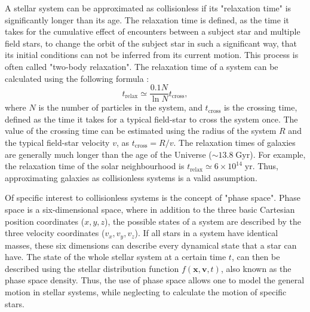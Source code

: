 \documentclass[english, twoside]{HYgradu}
\begin{document}
A stellar system can be approximated as collisionless if its "relaxation time" is significantly longer than its age. The relaxation time is defined, as the time it takes for the cumulative effect of encounters between a subject star and multiple field stars, to change the orbit of the subject star in such a significant way, that its initial conditions can not be inferred from its current motion. This process is often called "two-body relaxation". The relaxation time of a system can be calculated using the following formula \citep{BinneyTremaine}:
\begin{equation}
t_\mathrm{relax} \simeq \frac{0.1N}{\ln N} t_\mathrm{cross},
\end{equation}
where $N$ is the number of particles in the system, and $t_\mathrm{cross}$ is the crossing time, defined as the time it takes for a typical field-star to cross the system once.  The value of the crossing time can be estimated using the radius of the system $R$ and the typical field-star velocity $v$, as $t_\mathrm{cross} = R/v$. The relaxation times of galaxies are generally much longer than the age of the Universe ($\sim 13.8 \; \mathrm{Gyr}$). For example, the relaxation time of the solar neighbourhood is $t_\mathrm{relax} \simeq 6 \times 10^{14} \; \mathrm{yr}$. Thus, approximating galaxies as collisionless systems is a valid assumption.

Of specific interest to collisionless systems is the concept of "phase space". Phase space is a six-dimensional space, where in addition to the three basic Cartesian position coordinates ($x, y, z$), the possible states of a system are described by the three velocity coordinates ($v_x, v_y, v_z$). If all stars in a system have identical masses, these six dimensions can describe every dynamical state that a star can have. The state of the whole stellar system at a certain time $t$, can then be described using the stellar distribution function $f(\mathbf{x}, \mathbf{v}, t)$, also known as the phase space density. Thus, the use of phase space allows one to model the general motion in stellar systems, while neglecting to calculate the motion of specific stars.
\end{document}
